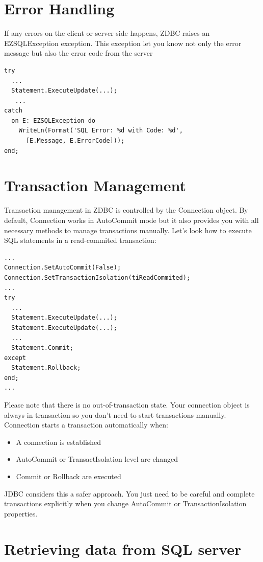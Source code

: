 \documentclass[a4paper,12pt,oneside]{book}
\begin{document}
\chapter{Error Handling}
If any errors on the client or server side happens, ZDBC raises an EZSQLException exception.
This exception let you know not only the error message but also the error code from the server

\begin{verbatim}
try
  ...
  Statement.ExecuteUpdate(...);
   ...
catch
  on E: EZSQLException do
    WriteLn(Format('SQL Error: %d with Code: %d',
      [E.Message, E.ErrorCode]));
end;
\end{verbatim}

\chapter{Transaction Management}
Transaction management in ZDBC is controlled by the Connection object.
By default, Connection works in AutoCommit mode but it also provides you with all necessary methods to manage transactions manually.
Let's look how to execute SQL statements in a read-commited transaction:

\begin{verbatim}
...
Connection.SetAutoCommit(False);
Connection.SetTransactionIsolation(tiReadCommited);
...
try
  ...
  Statement.ExecuteUpdate(...);
  Statement.ExecuteUpdate(...);
  ...
  Statement.Commit;
except
  Statement.Rollback;
end;
...
\end{verbatim}

Please note that there is no out-of-transaction state.
Your connection object is always in-transaction so you don't need to start transactions manually.
Connection starts a transaction automatically when:
\begin{itemize}
  \item A connection is established
  \item AutoCommit or TransactIsolation level are changed
  \item Commit or Rollback are executed
\end{itemize}

JDBC considers this a safer approach.
You just need to be careful and complete transactions explicitly when you change AutoCommit or TransactionIsolation properties. 

\chapter{Retrieving data from SQL server}
\end{document}
